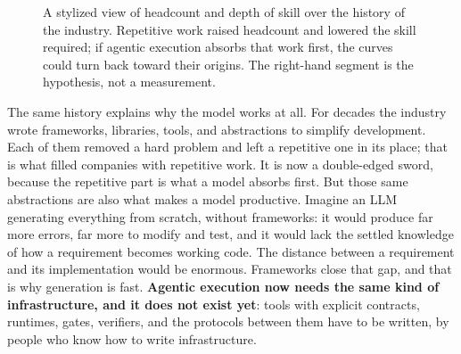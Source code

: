 \documentclass[10pt,oneside,openany]{book}
\begin{document}
\begin{figure}[!htbp]
\centering
{}
\caption{A stylized view of headcount and depth of skill over the history of the industry. Repetitive work raised headcount and lowered the skill required; if agentic execution absorbs that work first, the curves could turn back toward their origins. The right-hand segment is the hypothesis, not a measurement.}
\label{fig:skill-curve}
\end{figure}

The same history explains why the model works at all. For decades the industry wrote frameworks, libraries, tools, and abstractions to simplify development. Each of them removed a hard problem and left a repetitive one in its place; that is what filled companies with repetitive work. It is now a double-edged sword, because the repetitive part is what a model absorbs first. But those same abstractions are also what makes a model productive. Imagine an LLM generating everything from scratch, without frameworks: it would produce far more errors, far more to modify and test, and it would lack the settled knowledge of how a requirement becomes working code. The distance between a requirement and its implementation would be enormous. Frameworks close that gap, and that is why generation is fast. \textbf{Agentic execution now needs the same kind of infrastructure, and it does not exist yet}: tools with explicit contracts, runtimes, gates, verifiers, and the protocols between them have to be written, by people who know how to write infrastructure.
\end{document}
